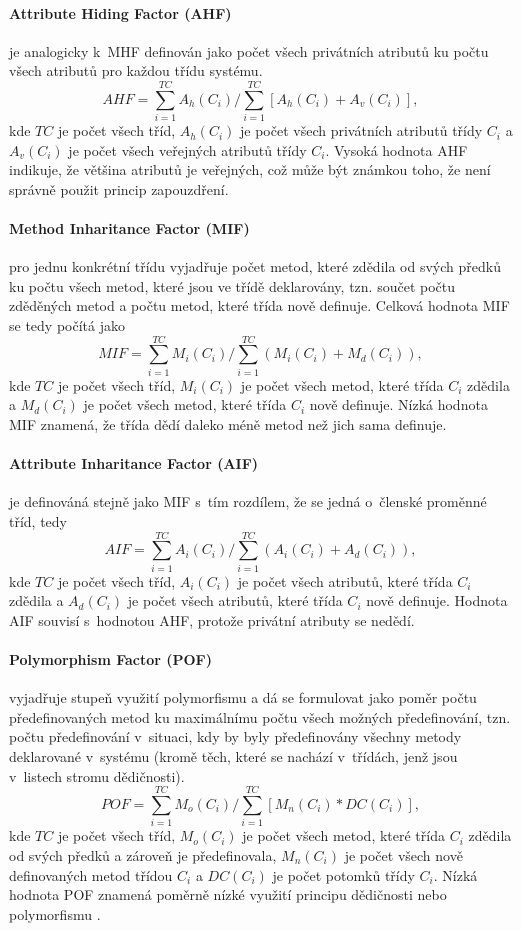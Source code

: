 \documentclass[11pt,twoside,a4paper]{book}
\begin{document}
\paragraph{Attribute Hiding Factor (AHF)} je analogicky k~MHF definován jako počet všech privátních atributů ku počtu všech atributů pro každou třídu systému.
$$AHF = \sum_{i=1}^{TC}{A_h(C_i)} / \sum_{i=1}^{TC}{[A_h(C_i) + A_v(C_i)]},$$
kde $TC$ je počet všech tříd, $A_h(C_i)$ je počet všech privátních atributů třídy $C_i$ a $A_v(C_i)$ je počet všech veřejných atributů třídy $C_i$.
Vysoká hodnota AHF indikuje, že většina atributů je veřejných, což může být známkou toho, že není správně použit princip zapouzdření.

\paragraph{Method Inharitance Factor (MIF)} pro jednu konkrétní třídu vyjadřuje počet metod, které zdědila od svých předků ku počtu všech
metod, které jsou ve třídě deklarovány, tzn. součet počtu zděděných metod a počtu metod, které třída nově definuje. Celková hodnota MIF
se tedy počítá jako
$$MIF = \sum_{i=1}^{TC}{M_i(C_i)} / \sum_{i=1}^{TC}{(M_i(C_i) + M_d(C_i))},$$
kde $TC$ je počet všech tříd, $M_i(C_i)$ je počet všech metod, které třída $C_i$ zdědila a $M_d(C_i)$ je počet všech metod, které třída $C_i$ nově definuje.
Nízká hodnota MIF znamená, že třída dědí daleko méně metod než jich sama definuje.

\paragraph{Attribute Inharitance Factor (AIF)} je definováná stejně jako MIF s~tím rozdílem, že se jedná o~členské proměnné tříd, tedy
$$AIF = \sum_{i=1}^{TC}{A_i(C_i)} / \sum_{i=1}^{TC}{(A_i(C_i) + A_d(C_i))},$$
kde $TC$ je počet všech tříd, $A_i(C_i)$ je počet všech atributů, které třída $C_i$ zdědila a $A_d(C_i)$ je počet všech atributů, které třída $C_i$ nově definuje.
Hodnota AIF souvisí s~hodnotou AHF, protože privátní atributy se nedědí.

\paragraph{Polymorphism Factor (POF)} vyjadřuje stupeň využití polymorfismu a dá se formulovat jako poměr počtu předefinovaných metod ku
maximálnímu počtu všech možných předefinování, tzn. počtu předefinování v~situaci, kdy by byly předefinovány všechny metody deklarované v~systému (kromě těch,
které se nachází v~třídách, jenž jsou v~listech stromu dědičnosti).
$$POF = \sum_{i=1}^{TC}{M_o(C_i)} / \sum_{i=1}^{TC}{[M_n(C_i) * DC(C_i)]},$$
kde $TC$ je počet všech tříd, $M_o(C_i)$ je počet všech metod, které třída $C_i$ zdědila od svých předků a zároveň je předefinovala,
$M_n(C_i)$ je počet všech nově definovaných metod třídou $C_i$
a $DC(C_i)$ je počet potomků třídy $C_i$.
Nízká hodnota POF znamená poměrně nízké využití principu dědičnosti nebo polymorfismu \cite{MOODtwo}.
\end{document}
